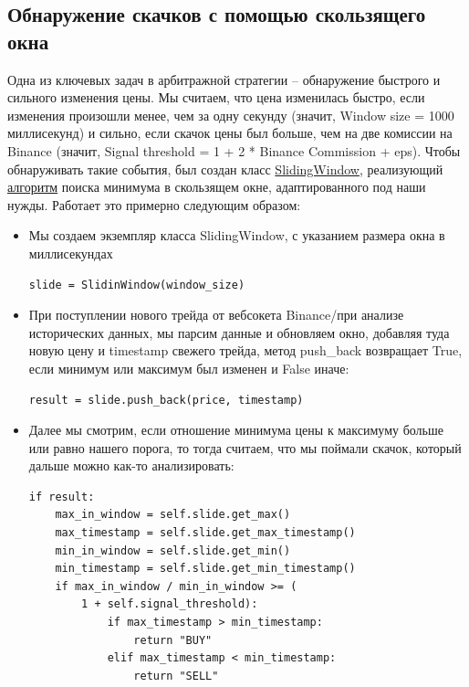 \subsection{Обнаружение скачков с помощью скользящего окна}
Одна из ключевых задач в арбитражной стратегии -- обнаружение быстрого и сильного изменения цены. Мы считаем, что цена изменилась быстро, если изменения произошли менее, чем за одну секунду (значит, Window size = 1000 миллисекунд) и сильно, если скачок цены был больше, чем на две комиссии на Binance (значит, Signal threshold = 1 + 2 * Binance Commission + eps). Чтобы обнаруживать такие события, был создан класс \href{https://github.com/dexety/dex-trading-system/blob/90a2ccd08234584b2ab9a274fe82533a55b924d9/utils/sliding_window.py#L12}{SlidingWindow}, реализующий \href{https://codeforces.com/blog/entry/71687?locale=ru}{алгоритм} поиска минимума в скользящем окне, адаптированного под наши нужды. Работает это примерно следующим образом:
\begin{itemize}
\item Мы создаем экземпляр класса SlidingWindow, с указанием размера окна в миллисекундах
\begin{verbatim}
slide = SlidinWindow(window_size)
\end{verbatim}

\item При поступлении нового трейда от вебсокета Binance/при анализе исторических данных, мы парсим данные и обновляем окно, добавляя туда новую цену и timestamp свежего трейда, метод push\_back возвращает True, если минимум или максимум был изменен и False иначе:
\begin{verbatim}
result = slide.push_back(price, timestamp)
\end{verbatim}

\item Далее мы смотрим, если отношение минимума цены к максимуму больше или равно нашего порога, то тогда считаем, что мы поймали скачок, который дальше можно как-то анализировать:
\begin{verbatim}
if result:
    max_in_window = self.slide.get_max()
    max_timestamp = self.slide.get_max_timestamp()
    min_in_window = self.slide.get_min()
    min_timestamp = self.slide.get_min_timestamp()
    if max_in_window / min_in_window >= (
        1 + self.signal_threshold):
            if max_timestamp > min_timestamp:
                return "BUY"
            elif max_timestamp < min_timestamp:
                return "SELL"
\end{verbatim}
\end{itemize}

